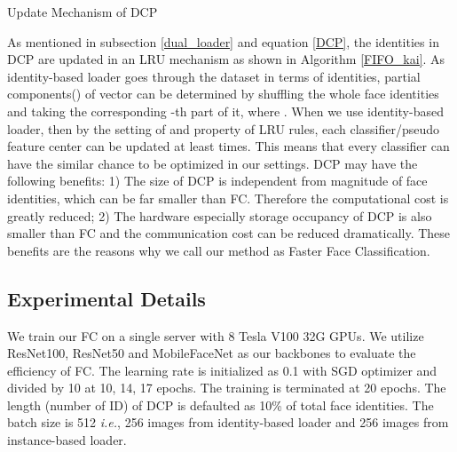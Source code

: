\begin{algorithm}[htp]
\caption{Update Mechanism of DCP}
\label{FIFO_kai}

\end{algorithm}


As mentioned in subsection \ref{dual_loader} and equation \ref{DCP}, the identities in DCP are updated in an LRU mechanism as shown in Algorithm \ref{FIFO_kai}.
As identity-based loader goes through the dataset in terms of identities,
partial components() of vector  can be determined by shuffling the whole face identities and taking the corresponding -th part of it, where .
When we use identity-based loader,
then by the setting of  and property of LRU rules, each classifier/pseudo feature center can be updated at least  times.
This means that every classifier can have the similar chance to be optimized in our settings.
DCP may have the following benefits: 1) The size of DCP is independent from magnitude of face identities, which can be far smaller than FC. Therefore the computational cost is greatly reduced; 2) The hardware especially storage occupancy of DCP is also smaller than FC and the communication cost can be reduced dramatically.
These benefits are the reasons why we call our method as Faster Face Classification.


\subsection{Experimental Details}
We train our FC on a single server with 8 Tesla V100 32G GPUs.
We utilize ResNet100, ResNet50 and MobileFaceNet as our backbones to evaluate the efficiency of FC.
The learning rate is initialized as 0.1 with SGD optimizer and divided by 10 at 10, 14, 17 epochs.
The training is terminated at 20 epochs.
The length (number of ID) of DCP is defaulted as 10\% of total face identities.
The batch size is 512 \textit{i.e.}, 256 images from identity-based loader and 256 images from instance-based loader. 




%
